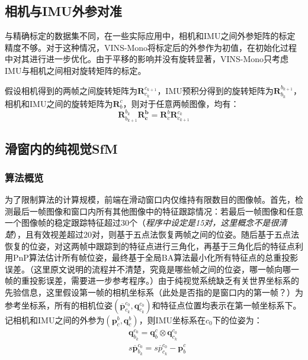\subsection{相机与IMU外参对准}
与精确标定的数据集不同，在一些实际应用中，相机和IMU之间外参矩阵的标定精度不够。对于这种情况，VINS-Mono将标定后的外参作为初值，在初始化过程中对其进行进一步优化。由于平移的影响并没有旋转显著，VINS-Mono只考虑IMU与相机之间相对旋转矩阵的标定。

假设相机得到的两帧之间旋转矩阵为$\bm{R}_{c_k}^{c_{k+1}}$，IMU预积分得到的旋转矩阵为$\bm{R}_{b_k}^{b_{k+1}}$，相机和IMU之间的旋转矩阵为$\bm{R}_b^c$，则对于任意两帧图像，均有：
\begin{equation}
\bm{R}_{b_{k+1}}^{b_k}\bm{R^b_c}=\bm{R}_c^b\bm{R}_{c_{k+1}}^{c_k}
\end{equation}
\subsection{滑窗内的纯视觉SfM}
\subsubsection{算法概览}
为了限制算法的计算规模，前端在滑动窗口内仅维持有限数目的图像帧。首先，检测最后一帧图像和窗口内所有其他图像中的特征跟踪情况：若最后一帧图像和任意一个图像帧的稳定跟踪特征超过30个（\textit{程序中设定是15对，这里概念不是很清楚}），且有效视差超过20对，则基于五点法恢复两帧之间的位姿。随后基于五点法恢复的位姿，对这两帧中跟踪到的特征点进行三角化，再基于三角化后的特征点利用PnP算法估计所有帧位姿，最终基于全局BA算法最小化所有特征点的总重投影误差。（这里原文说明的流程并不清楚，究竟是哪些帧之间的位姿，哪一帧向哪一帧的重投影误差，需要进一步参考程序。）由于纯视觉系统缺乏有关世界坐标系的先验信息，这里假设第一帧的相机坐标系（此处是否指的是窗口内的第一帧？）为参考坐标系，所有的相机位姿$\left(\overline{\bm{p}}_{c_k}^{c_0},\bm{q}_{c_k}^{c_0}\right)$和特征点位置均表示在第一帧坐标系下。记相机和IMU之间的外参为$\left(\bm{p}_c^b,\bm{q}_c^b\right)$，则IMU坐标系在$c_0$下的位姿为：
\begin{equation}\begin{aligned}
&\bm{q}_{b_k}^{c_0}=\bm{q}_b^c\otimes\bm{q}_{c_k}^{c_0}\\
&s\overline{\bm{p}}_{b_k}^{c_0}=s\overline{p}_{c_k}^{c_0}-\bm{p}^c_b
\end{aligned}
\end{equation}
